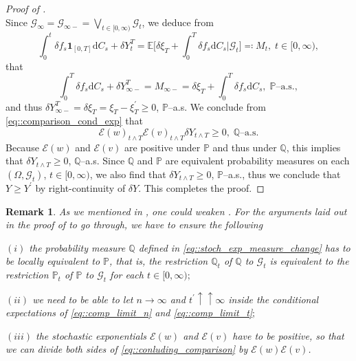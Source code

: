 \documentclass[10pt]{article} %
\newtheorem{remark}[theorem]{Remark}
\newcommand\cE{\mathcal E}
\newcommand\cG{\mathcal G}
\def \E{\mathbb{E}}
\def \P{\mathbb{P}}
\def \Q{\mathbb{Q}}
\def\d{\mathrm{d}}
\begin{document}
\begin{proof}[Proof of ]
\begin{equation}
	\end{equation}
	Since $\cG_{\infty} = \cG_{\infty-} = \bigvee_{t \in [0,\infty)} \cG_t$, we deduce from
	\begin{equation*}
		\int_0^t \delta f_s \mathbf{1}_{[0,T]} \d C_s + \delta Y^T_t = \E \bigg[\delta \xi_T + \int_0^T \delta f_s \d C_s \bigg| \cG_t\bigg] \eqqcolon M_t, \; t \in [0,\infty),
	\end{equation*}
	that 
	\begin{equation*}
		\int_0^T \delta f_s \d C_s + \delta Y^T_{\infty-} = M_{\infty-} = \delta \xi_T + \int_0^T \delta f_s \d C_s, \;\text{$\P$--a.s.},
	\end{equation*}
	and thus $\delta Y^T_{\infty-} = \delta\xi_T = \xi_T - \xi^\prime_T \geq 0$, $\P$--a.s. We conclude from \eqref{eq::comparison_cond_exp} that 
	\begin{equation}\label{eq::conluding_comparison}
		\cE(w)_{t \land T}\cE(v)_{t \land T}\delta Y_{t \land T} \geq 0, \; \text{$\Q$--a.s.}
	\end{equation}
	Because $\cE(w)$ and $\cE(v)$ are positive under $\P$ and thus under $\Q$, this implies that $\delta Y_{t \land T} \geq 0$, $\Q$--a.s. Since $\Q$ and $\P$ are equivalent probability measures on each $(\Omega,\cG_t)$, $t \in [0,\infty)$, we also find that $\delta Y_{t \land T} \geq 0$, $\P$--a.s., thus we conclude that $Y \geq Y^\prime$ by right-continuity of $\delta Y$. This completes the proof.
	\endgroup
\end{proof}

\begin{remark}\label{rem::comparison_proof}
	As we mentioned in {\rm{}}, one could weaken {\rm{}}. For the arguments laid out in the proof of {\rm{}} to go through, we have to ensure the following
	
	\medskip
	$(i)$ the probability measure $\Q$ defined in \eqref{eq::stoch_exp_measure_change} has to be locally equivalent to $\P$, that is, the restriction $\Q_t$ of $\Q$ to $\cG_t$ is equivalent to the restriction $\P_t$ of $\P$ to $\cG_t$ for each $t \in [0,\infty);$
	
	\medskip
	$(ii)$ we need to be able to let $n \rightarrow \infty$ and $t^\prime \uparrow\uparrow \infty$ inside the conditional expectations of \eqref{eq::comp_limit_n} and \eqref{eq::comp_limit_t}$;$
	
	\medskip
	$(iii)$ the stochastic exponentials $\cE(w)$ and $\cE(v)$ have to be positive, so that we can divide both sides of \eqref{eq::conluding_comparison} by $\cE(w)\cE(v)$.
\end{remark}
\end{document}
